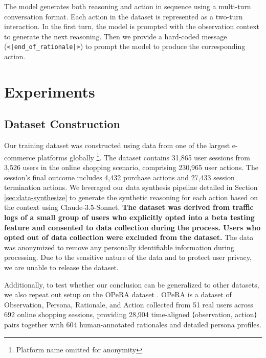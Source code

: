 \documentclass{article} %
\newcommand{\jing}[1]{\textcolor{purple}{{[Jing: #1]}}}
\begin{document}
The model generates both reasoning and action in sequence using a multi-turn conversation format. Each action in the dataset is represented as a two-turn interaction. In the first turn, the model is prompted with the observation context to generate the next reasoning. Then we provide a hard-coded message (\texttt{<|end\_of\_rationale|>}) to prompt the model to produce the corresponding action.

\section{Experiments}
\subsection{Dataset Construction}

Our training dataset was constructed using data from one of the largest e-commerce platforms globally \footnote{Platform name omitted for anonymity}.
The dataset contains 31,865 user sessions from 3,526 users in the online shopping scenario, comprising  230,965 user actions.
The session's final outcome includes 4,432 purchase actions and 27,433 session termination actions.
We leveraged our data synthesis pipeline detailed in Section \ref{sec:data-synthesize} to generate the synthetic reasoning for each action based on the context
using Claude-3.5-Sonnet.
\textbf{The dataset was derived from traffic logs of a small group of users who explicitly opted into a beta testing feature and consented to data collection during the process.
Users who opted out of data collection were excluded from the dataset.}
The data was anonymized to remove any personally identifiable information during processing. Due to the sensitive nature of the data and to protect user privacy, we are unable to release the dataset.


Additionally, to test whether our conclusion can be generalized to other datasets, we also repeat out setup on the OPeRA dataset \cite{wangOPeRADatasetObservation2025}. OPeRA is a dataset of Observation, Persona, Rationale, and Action collected from 51 real users across 692 online shopping sessions, providing 28,904 time-aligned ⟨observation, action⟩ pairs together with 604 human-annotated rationales and detailed persona profiles. 


\end{document}

